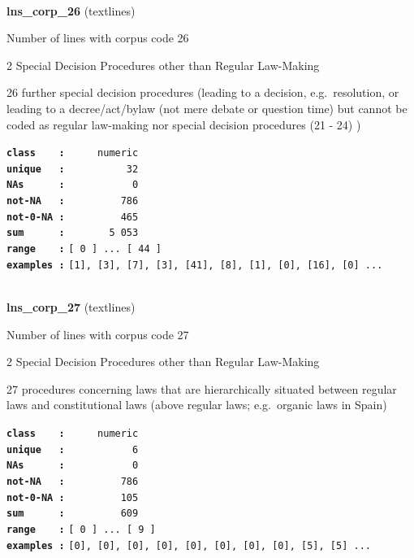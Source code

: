 \documentclass[]{article}
\begin{document}
~

\textbf{lns\_corp\_26} (textlines)

Number of lines with corpus code 26

2 Special Decision Procedures other than Regular Law-Making

26 further special decision procedures (leading to a decision,
e.g.~resolution, or leading to a decree/act/bylaw (not mere debate or
question time) but cannot be coded as regular law-making nor special
decision procedures (21 - 24) )

\textbf{\texttt{class\ \ \ \ :}} \texttt{~~~~~numeric}\\
\textbf{\texttt{unique\ \ \ :}} \texttt{~~~~~~~~~~32}\\
\textbf{\texttt{NAs\ \ \ \ \ \ :}} \texttt{~~~~~~~~~~~0}\\
\textbf{\texttt{not-NA\ \ \ :}} \texttt{~~~~~~~~~786}\\
\textbf{\texttt{not-0-NA\ :}} \texttt{~~~~~~~~~465}\\
\textbf{\texttt{sum\ \ \ \ \ \ :}} \texttt{~~~~~~~5~053}\\
\textbf{\texttt{range\ \ \ \ :}}
\texttt{{[}\ 0\ {]}\ ...\ {[}\ 44\ {]}}\\
\textbf{\texttt{examples\ :}}
\texttt{{[}1{]},\ {[}3{]},\ {[}7{]},\ {[}3{]},\ {[}41{]},\ {[}8{]},\ {[}1{]},\ {[}0{]},\ {[}16{]},\ {[}0{]}\ ...}\\

~

\textbf{lns\_corp\_27} (textlines)

Number of lines with corpus code 27

2 Special Decision Procedures other than Regular Law-Making

27 procedures concerning laws that are hierarchically situated between
regular laws and constitutional laws (above regular laws; e.g.~organic
laws in Spain)

\textbf{\texttt{class\ \ \ \ :}} \texttt{~~~~~numeric}\\
\textbf{\texttt{unique\ \ \ :}} \texttt{~~~~~~~~~~~6}\\
\textbf{\texttt{NAs\ \ \ \ \ \ :}} \texttt{~~~~~~~~~~~0}\\
\textbf{\texttt{not-NA\ \ \ :}} \texttt{~~~~~~~~~786}\\
\textbf{\texttt{not-0-NA\ :}} \texttt{~~~~~~~~~105}\\
\textbf{\texttt{sum\ \ \ \ \ \ :}} \texttt{~~~~~~~~~609}\\
\textbf{\texttt{range\ \ \ \ :}}
\texttt{{[}\ 0\ {]}\ ...\ {[}\ 9\ {]}}\\
\textbf{\texttt{examples\ :}}
\texttt{{[}0{]},\ {[}0{]},\ {[}0{]},\ {[}0{]},\ {[}0{]},\ {[}0{]},\ {[}0{]},\ {[}0{]},\ {[}5{]},\ {[}5{]}\ ...}\\
\end{document}
